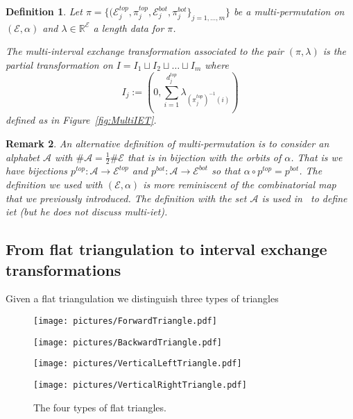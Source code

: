 \documentclass{article}
\def\RR{\mathbb{R}}
\def\cA{\mathcal{A}}
\def\cE{\mathcal{E}}
\newtheorem{definition}{Definition}
\newtheorem{remark}[definition]{Remark}
\begin{document}
\begin{definition}
Let $\pi = \{(\cE^{top}_j, \pi^{top}_j, \cE^{bot}_j, \pi^{bot}_j\}_{j=1,\ldots,m}\}$
be a multi-permutation on $(\cE, \alpha)$ and $\lambda \in \RR^\cE$
a length data for $\pi$.

The \emph{multi-interval exchange transformation} associated to the pair $(\pi,\lambda)$
is the partial transformation on $I = I_1 \sqcup I_2 \sqcup \ldots \sqcup I_m$ where
\[
I_j := \left(0, \sum_{i=1}^{d_j^{top}} \lambda_{(\pi^{top}_j)^{-1}(i)} \right)
\]
defined as in Figure~\ref{fig:MultiIET}.
\end{definition}

\begin{remark}
An alternative definition of multi-permutation is to consider an alphabet $\cA$
with $\# \cA = \frac{1}{2} \# \cE$ that is in bijection with the orbits of
$\alpha$. That is we have bijections $p^{top}: \cA \to \cE^{top}$ and
$p^{bot}: \cA \to \cE^{bot}$ so that $\alpha \circ p^{top} = p^{bot}$.
The definition we used with $(\cE, \alpha)$ is more reminiscent of
the combinatorial map that we previously introduced. The definition with the set
$\cA$ is used in~\cite{Yoccoz} to define iet (but he does not discuss multi-iet).
\end{remark}


\subsection{From flat triangulation to interval exchange transformations}
Given a flat triangulation we distinguish three types of triangles
\begin{figure}[!ht]\begin{center}
\begin{minipage}{0.24\textwidth}
\begin{center}\texttt{[image: pictures/ForwardTriangle.pdf]}\end{center}
\end{minipage}
\begin{minipage}{0.24\textwidth}
\begin{center}\texttt{[image: pictures/BackwardTriangle.pdf]}\end{center}
\end{minipage}
\begin{minipage}{0.24\textwidth}
\begin{center}\texttt{[image: pictures/VerticalLeftTriangle.pdf]}\end{center}
\end{minipage}
\begin{minipage}{0.24\textwidth}
\begin{center}\texttt{[image: pictures/VerticalRightTriangle.pdf]}\end{center}
\end{minipage}
\caption{The four types of flat triangles.}
\end{center}\end{figure}
\end{document}
